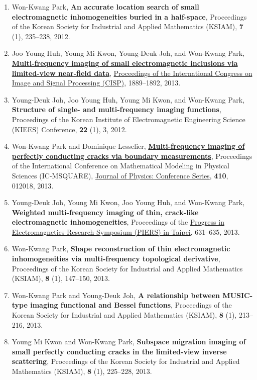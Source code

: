 \documentclass[10pt,A4]{article}
\begin{document}
\begin{enumerate}
\item\label{C-KSIAM2012} Won-Kwang Park, \textbf{An accurate location search of small electromagnetic inhomogeneities buried in a half-space}, Proceedings of the Korean Society for Industrial and Applied Mathematics (KSIAM), \textbf{7} (1), 235--238, 2012.
\item\label{C-CISP2013A} Joo Young Huh, Young Mi Kwon, Young-Deuk Joh, and Won-Kwang Park, \href{http://dx.doi.org/10.1109/CISP.2012.6469648}{\textbf{Multi-frequency imaging of small electromagnetic inclusions via limited-view near-field data}}, \href{http://ieeexplore.ieee.org/xpl/mostRecentIssue.jsp?punumber=6459618}{Proceedings of the  International Congress on Image and Signal Processing (CISP)}, 1889--1892, 2013.
\item\label{C-KIEES2012} Young-Deuk Joh, Joo Young Huh, Young Mi Kwon, and Won-Kwang Park, \textbf{Structure of single- and multi-frequency imaging functions}, Proceedings of the Korean Institute of Electromagnetic Engineering Science (KIEES) Conference, \textbf{22} (1), 3, 2012.
\item\label{C-ICMSQUARE2013} Won-Kwang Park and Dominique Lesselier, \href{http://dx.doi.org/10.1088/1742-6596/410/1/012018}{\textbf{Multi-frequency imaging of perfectly conducting cracks via boundary measurements}}, Proceedings of the International Conference on Mathematical Modeling in Physical Sciences (IC-MSQUARE), \href{http://iopscience.iop.org/1742-6596/}{Journal of Physics: Conference Series}, \textbf{410}, 012018, 2013.
\item\label{C-PIERS2013} Young-Deuk Joh, Young Mi Kwon, Joo Young Huh, and Won-Kwang Park, \textbf{Weighted multi-frequency imaging of thin, crack-like electromagnetic inhomogeneities}, Proceedings of the \href{http://www.piers.org/piers2013Taipei/}{Progress in Electromagnetics Research Symposium (PIERS) in Taipei}, 631--635, 2013.
\item\label{C-KSIAM2013A} Won-Kwang Park, \textbf{Shape reconstruction of thin electromagnetic inhomogeneities via multi-frequency topological derivative}, Proceedings of the Korean Society for Industrial and Applied Mathematics (KSIAM), \textbf{8} (1), 147--150, 2013.
\item\label{C-KSIAM2013B} Won-Kwang Park and Young-Deuk Joh, \textbf{A relationship between MUSIC-type imaging functional and Bessel functions}, Proceedings of the Korean Society for Industrial and Applied Mathematics (KSIAM), \textbf{8} (1), 213--216, 2013.
\item\label{C-KSIAM2013C} Young Mi Kwon and Won-Kwang Park, \textbf{Subspace migration imaging of small perfectly conducting cracks in the limited-view inverse scattering}, Proceedings of the Korean Society for Industrial and Applied Mathematics (KSIAM), \textbf{8} (1), 225--228, 2013.

\end{enumerate}
\end{document}
